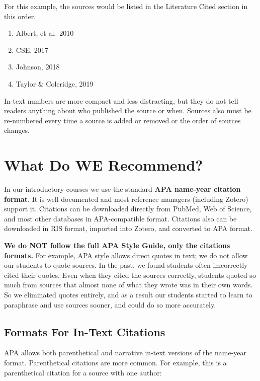 \documentclass[
]{book}
\providecommand{\tightlist}{%
  \setlength{\itemsep}{0pt}\setlength{\parskip}{0pt}}
\begin{document}
For this example, the sources would be listed in the Literature Cited section in this order.

\begin{enumerate}
\def\labelenumi{\arabic{enumi}.}
\tightlist
\item
  Albert, et al.~2010
\item
  CSE, 2017
\item
  Johnson, 2018
\item
  Taylor \& Coleridge, 2019
\end{enumerate}

In-text numbers are more compact and less distracting, but they do not tell readers anything about who published the source or when. Sources also must be re-numbered every time a source is added or removed or the order of sources changes.

\hypertarget{what-do-we-recommend}{%
\section{What Do WE Recommend?}\label{what-do-we-recommend}}

In our introductory courses we use the standard \textbf{APA name-year citation format}. It is well documented and most reference managers (including Zotero) support it. Citations can be downloaded directly from PubMed, Web of Science, and most other databases in APA-compatible format. Citations also can be downloaded in RIS format, imported into Zotero, and converted to APA format.

\textbf{We do NOT follow the full APA Style Guide, only the citations formats.} For example, APA style allows direct quotes in text; we do not allow our students to quote sources. In the past, we found students often imcorrectly cited their quotes. Even when they cited the sources correctly, students quoted so much from sources that almost none of what they wrote was in their own words. So we eliminated quotes entirely, and as a result our students started to learn to paraphrase and use sources sooner, and could do so more accurately.

\hypertarget{formats-for-in-text-citations}{%
\subsection{Formats For In-Text Citations}\label{formats-for-in-text-citations}}

APA allows both parenthetical and narrative in-text versions of the name-year format. Parenthetical citations are more common. For example, this is a parenthetical citation for a source with one author:
\end{document}
